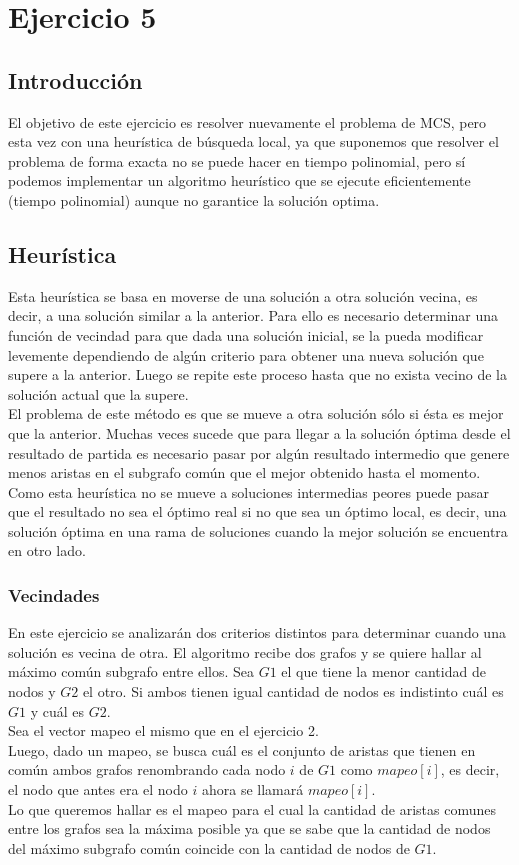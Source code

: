 \section{Ejercicio 5}
\subsection{Introducción}
\noindent El objetivo de este ejercicio es resolver nuevamente el problema de MCS, pero esta vez con una heurística de búsqueda local, ya que suponemos que resolver el problema de forma exacta no se puede hacer en tiempo polinomial, pero sí podemos implementar un algoritmo heurístico que se ejecute eficientemente (tiempo polinomial) aunque no garantice la solución optima.
\subsection{Heurística}
\noindent Esta heurística se basa en moverse de una solución a otra solución vecina, es decir, a una solución similar a la anterior. Para ello es necesario determinar una función de vecindad para que dada una solución inicial, se la pueda modificar levemente dependiendo de algún criterio para obtener una nueva solución que supere a la anterior. Luego se repite este proceso hasta que no exista vecino de la solución actual que la supere.\\
El problema de este método es que se mueve a otra solución sólo si ésta es mejor que la anterior. Muchas veces sucede que para llegar a la solución óptima desde el resultado de partida es necesario pasar por algún resultado intermedio que genere menos aristas en el subgrafo común que el mejor obtenido hasta el momento. Como esta heurística no se mueve a soluciones intermedias peores puede pasar que el resultado no sea el óptimo real si no que sea un óptimo local, es decir, una solución óptima en una rama de soluciones cuando la mejor solución se encuentra en otro lado.

\subsubsection*{Vecindades}
\noindent En este ejercicio se analizarán dos criterios distintos para determinar cuando una solución es vecina de otra.
El algoritmo recibe dos grafos y se quiere hallar al máximo común subgrafo entre ellos. Sea $G1$ el que tiene la menor cantidad de nodos y $G2$ el otro. Si ambos tienen igual cantidad de nodos es indistinto cuál es $G1$ y cuál es $G2$.\\
Sea el vector mapeo el mismo que en el ejercicio 2.\\
\noindent Luego, dado un mapeo, se busca cuál es el conjunto de aristas que tienen en común ambos grafos renombrando cada nodo $i$ de $G1$ como $mapeo[i]$, es decir, el nodo que antes era el nodo $i$ ahora se llamará $mapeo[i]$.\\
Lo que queremos hallar es el mapeo para el cual la cantidad de aristas comunes entre los grafos sea la máxima posible ya que se sabe que la cantidad de nodos del máximo subgrafo común coincide con la cantidad de nodos de $G1$. \\

